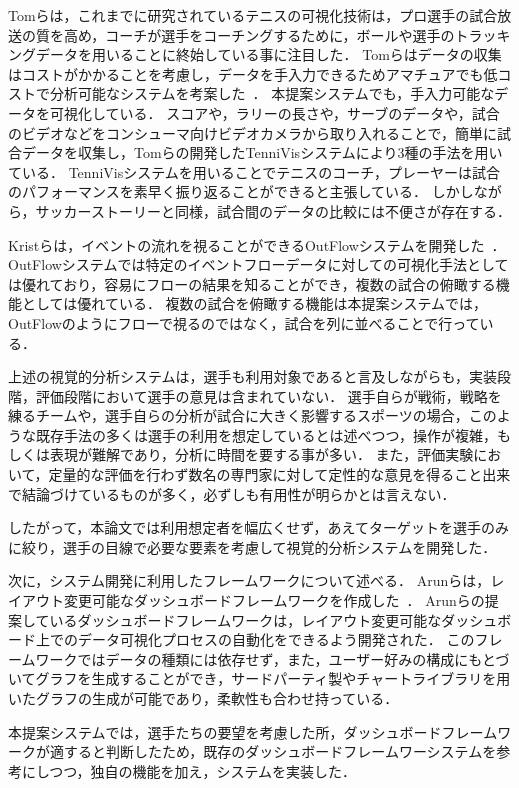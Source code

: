 \documentclass[sotsuron]{kuee}
\begin{document}
	Tomらは，これまでに研究されているテニスの可視化技術は，プロ選手の試合放送の質を高め，コーチが選手をコーチングするために，ボールや選手のトラッキングデータを用いることに終始している事に注目した．
	Tomらはデータの収集はコストがかかることを考慮し，データを手入力できるためアマチュアでも低コストで分析可能なシステムを考案した~\cite{TenniVis}．
	本提案システムでも，手入力可能なデータを可視化している．
	スコアや，ラリーの長さや，サーブのデータや，試合のビデオなどをコンシューマ向けビデオカメラから取り入れることで，簡単に試合データを収集し，Tomらの開発したTenniVisシステムにより3種の手法を用いている．
	TenniVisシステムを用いることでテニスのコーチ，プレーヤーは試合のパフォーマンスを素早く振り返ることができると主張している．
	しかしながら，サッカーストーリーと同様，試合間のデータの比較には不便さが存在する．
	
	Kristらは，イベントの流れを視ることができるOutFlowシステムを開発した~\cite{Outflow}．
	OutFlowシステムでは特定のイベントフローデータに対しての可視化手法としては優れており，容易にフローの結果を知ることができ，複数の試合の俯瞰する機能としては優れている．
	複数の試合を俯瞰する機能は本提案システムでは，OutFlowのようにフローで視るのではなく，試合を列に並べることで行っている．

	上述の視覚的分析システムは，選手も利用対象であると言及しながらも，実装段階，評価段階において選手の意見は含まれていない．
	選手自らが戦術，戦略を練るチームや，選手自らの分析が試合に大きく影響するスポーツの場合，このような既存手法の多くは選手の利用を想定しているとは述べつつ，操作が複雑，もしくは表現が難解であり，分析に時間を要する事が多い．
	また，評価実験において，定量的な評価を行わず数名の専門家に対して定性的な意見を得ること出来で結論づけているものが多く，必ずしも有用性が明らかとは言えない．
	
	したがって，本論文では利用想定者を幅広くせず，あえてターゲットを選手のみに絞り，選手の目線で必要な要素を考慮して視覚的分析システムを開発した．
	
	次に，システム開発に利用したフレームワークについて述べる．	
	Arunらは，レイアウト変更可能なダッシュボードフレームワークを作成した~\cite{dashboard}．
	Arunらの提案しているダッシュボードフレームワークは，レイアウト変更可能なダッシュボード上でのデータ可視化プロセスの自動化をできるよう開発された．
	このフレームワークではデータの種類には依存せず，また，ユーザー好みの構成にもとづいてグラフを生成することができ，サードパーティ製やチャートライブラリを用いたグラフの生成が可能であり，柔軟性も合わせ持っている．
	
	本提案システムでは，選手たちの要望を考慮した所，ダッシュボードフレームワークが適すると判断したため，既存のダッシュボードフレームワーシステムを参考にしつつ，独自の機能を加え，システムを実装した．
\end{document}
